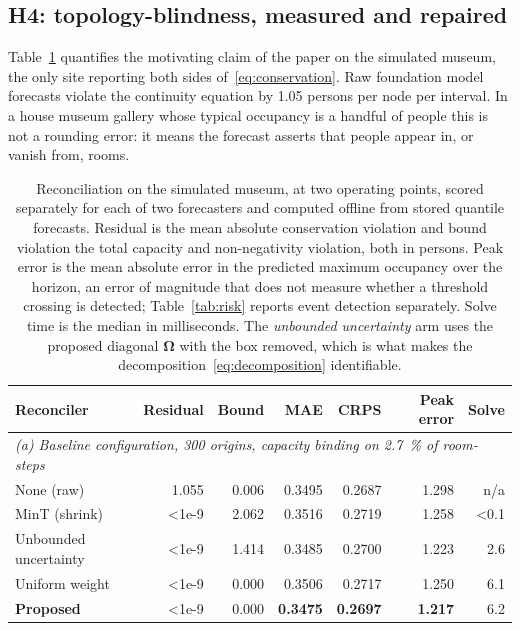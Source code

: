 \documentclass[utf8]{FrontiersinHarvard}
\newif\ifrevisionmarkup
\newcommand{\new}[1]{\ifrevisionmarkup\textcolor{revision}{#1}\else#1\fi}
\newif\ifsecondrevisionmarkup
\newcommand{\rev}[1]{\ifsecondrevisionmarkup\textcolor{revisiontwo}{#1}\else#1\fi}
\theoremstyle{plain}
\theoremstyle{definition}
\theoremstyle{remark}
\newcommand{\bOm}{\bm{\Omega}}
\newcommand{\best}[1]{\textbf{#1}}
\begin{document}
\subsection{H4: topology-blindness, measured and repaired}

Table~\ref{tab:recon} quantifies the motivating claim of the paper on the simulated museum, the only site reporting both sides of~\eqref{eq:conservation}. Raw foundation model forecasts violate the continuity equation by \num{1.05} persons per node per interval. In a house museum gallery whose typical occupancy is a handful of people this is not a rounding error: it means the forecast asserts that people appear in, or vanish from, rooms.

\begin{table}[htbp]
\centering
\caption{Reconciliation on the simulated museum, \new{at two operating points}, scored separately for each of two forecasters and computed offline from stored quantile forecasts. Residual is the mean absolute conservation violation and bound violation the total capacity and non-negativity violation, both in persons. \new{Peak error is the mean absolute error in the predicted maximum occupancy over the horizon\rev{, an error of magnitude that does not measure whether a threshold crossing is detected; Table~\ref{tab:risk} reports event detection separately}.} Solve time is the median in milliseconds. \new{The \emph{unbounded uncertainty} arm uses the proposed diagonal $\bOm$ with the box removed, which is what makes the decomposition~\eqref{eq:decomposition} identifiable.}}
\label{tab:recon}
\footnotesize
\setlength{\tabcolsep}{5pt}
\begin{tabular}{lrrrrrr}
\toprule
Reconciler & Residual & Bound & MAE & CRPS & \new{Peak error} & Solve \\
\midrule
\multicolumn{7}{l}{\emph{\new{(a) Baseline configuration, \num{300} origins, capacity binding on \SI{2.7}{\percent} of room-steps}}}\\
None (raw)              & \num{1.055} & \num{0.006} & 0.3495 & 0.2687 & 1.298 & n/a \\
MinT (shrink)           & \num{<1e-9} & \num{2.062} & 0.3516 & 0.2719 & 1.258 & \num{<0.1} \\
\new{Unbounded uncertainty} & \num{<1e-9} & \num{1.414} & 0.3485 & 0.2700 & 1.223 & 2.6 \\
Uniform weight          & \num{<1e-9} & \num{0.000} & 0.3506 & 0.2717 & 1.250 & 6.1 \\
\textbf{Proposed}       & \num{<1e-9} & \num{0.000} & \best{0.3475} & \best{0.2697} & \best{1.217} & 6.2 \\

\end{tabular}
\end{table}
\end{document}
